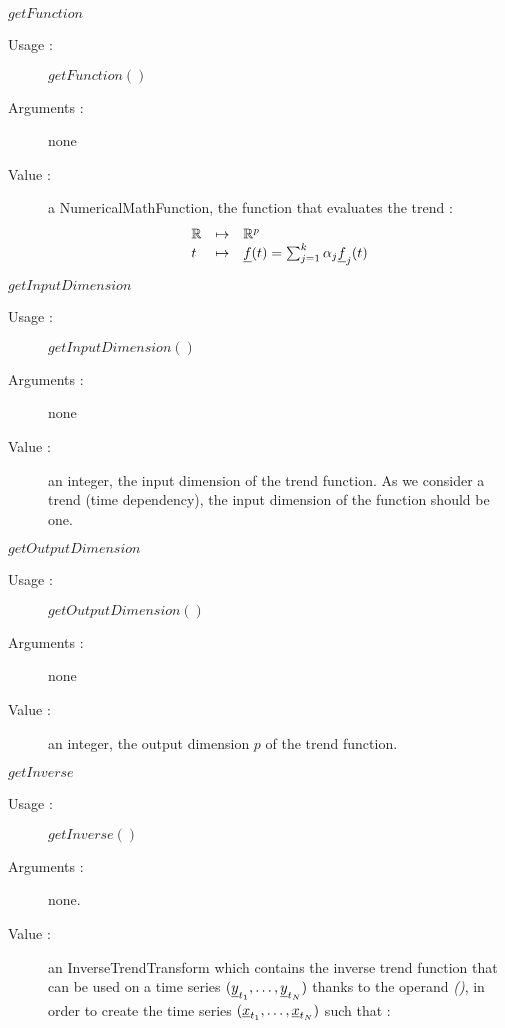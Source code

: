 \begin{description}
\begin{description}
   \item $getFunction$
    \begin{description}
    \item[Usage :] $getFunction()$
    \item[Arguments :] none
    \item[Value :]  a NumericalMathFunction, the function that evaluates the trend :
\begin{equation}
\begin{array}{lcl}\label{Function}
  \mathbb{R} & \mapsto & \mathbb{R}^{p} \\
  t & \mapsto & {\underline{f}}(t) = \sum_{j=1}^{k} \alpha_j {\underline{f}}_j(t)
\end{array}
\end{equation} 
    \end{description}
    \bigskip

   \item $getInputDimension$
    \begin{description}
    \item[Usage :] $getInputDimension()$
    \item[Arguments :] none
    \item[Value :]   an integer, the input dimension of the trend function. As we consider a trend (time dependency), the input dimension of the function should be one. 
    \end{description}
    \bigskip

   \item $getOutputDimension$
    \begin{description}
    \item[Usage :] $getOutputDimension()$
    \item[Arguments :] none
    \item[Value :]   an integer, the output dimension  $p$ of the trend function.
    \end{description}
    \bigskip

  \item $getInverse$
    \begin{description}
    \item[Usage :] $getInverse()$
    \item[Arguments :] none.
    \item[Value :]   an InverseTrendTransform which contains the inverse trend function that can be used on a time series  $({\underline{y}}_{t_1}, \dots,{\underline{y}}_{t_N})$ thanks to the operand  \emph{()}, in order to create the time series $({\underline{x}}_{t_1}, \dots,{\underline{x}}_{t_N})$ such that :


\end{description}
\end{description}
\end{description}
